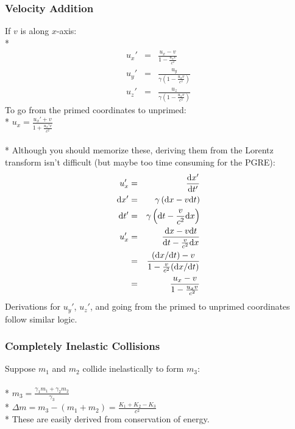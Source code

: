 \subsubsection{Velocity Addition}
If \(v\) is along \(x\)-axis:\\*
\begin{eqnarray}
\displaystyle u_x'&=&\frac{u_x-v}{1-\frac{u_xv}{c^2}}\nonumber\\
\displaystyle u_y'&=&\frac{u_y}{\gamma\left(1-\frac{u_xv}{c^2}\right)}\nonumber\\
\displaystyle u_z'&=&\frac{u_z}{\gamma\left(1-\frac{u_xv}{c^2}\right)}\nonumber
\end{eqnarray}
To go from the primed coordinates to unprimed:\\*
\(\displaystyle u_x=\frac{u_x'+v}{1+\frac{u_x'v}{c^2}}\)\\\\*
Although you should memorize these, deriving them from the Lorentz transform isn't difficult (but maybe too time consuming for the PGRE):
\begin{eqnarray}
\displaystyle u_x'&=&\frac{\mathrm{d}x'}{\mathrm{d}t'} \nonumber\\
\displaystyle \mathrm{d}x'&=&\gamma\left(\mathrm{d}x-v\mathrm{d}t\right) \nonumber\\
\displaystyle \mathrm{d}t'&=&\gamma\left(\mathrm{d}t-\frac{v}{c^2}\mathrm{d}x\right) \nonumber\\
\displaystyle u_x'&=&\frac{\mathrm{d}x-v\mathrm{d}t}{\mathrm{d}t-\frac{v}{c^2}\mathrm{d}x} \nonumber\\
\displaystyle &=& \frac{(\mathrm{d}x/\mathrm{d}t)-v}{1-\frac{v}{c^2}(\mathrm{d}x/\mathrm{d}t)} \nonumber\\
\displaystyle &=& \frac{u_x-v}{1-\frac{u_xv}{c^2}}\nonumber
\end{eqnarray}
Derivations for \(u_y'\), \(u_z'\), and going from the primed to unprimed coordinates follow similar logic.

\subsubsection{Completely Inelastic Collisions}
Suppose \(m_1\) and \(m_2\) collide inelastically to form \(m_3\):\\\\*
\(\displaystyle m_3=\frac{\gamma_1 m_1+\gamma_2 m_2}{\gamma_3}\) \\*
\(\displaystyle \Delta m=m_3-(m_1+m_2)=\frac{K_1+K_2-K_3}{c^2}\)\\*
These are easily derived from conservation of energy.


